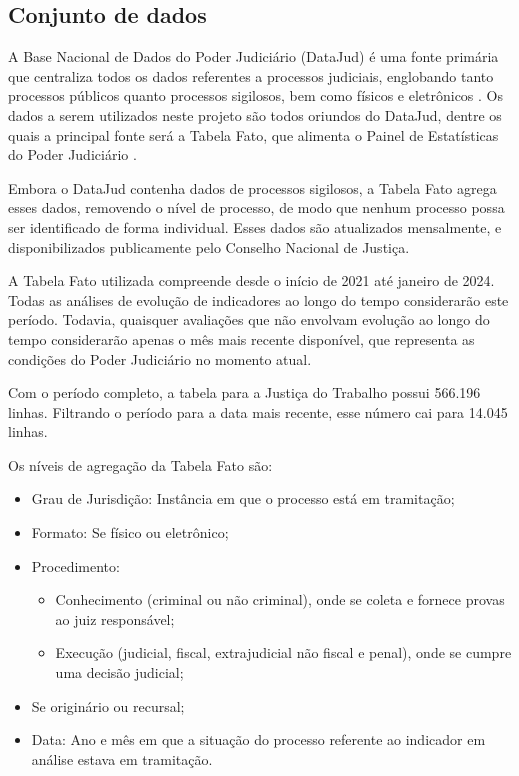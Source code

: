 
\subsection{Conjunto de dados}

A Base Nacional de Dados do Poder Judiciário (DataJud) é uma fonte primária que centraliza todos os dados referentes a processos judiciais, englobando tanto processos públicos quanto processos sigilosos, bem como físicos e eletrônicos \cite{datajud}. Os dados a serem utilizados neste projeto são todos oriundos do DataJud, dentre os quais a principal fonte será a Tabela Fato, que alimenta o Painel de Estatísticas do Poder Judiciário \cite{painelestatistica}.

Embora o DataJud contenha dados de processos sigilosos, a Tabela Fato agrega esses dados, removendo o nível de processo, de modo que nenhum processo possa ser identificado de forma individual. Esses dados são atualizados mensalmente, e disponibilizados publicamente pelo Conselho Nacional de Justiça.

A Tabela Fato utilizada compreende desde o início de 2021 até janeiro de 2024. Todas as análises de evolução de indicadores ao longo do tempo considerarão este período. Todavia, quaisquer avaliações que não envolvam evolução ao longo do tempo considerarão apenas o mês mais recente disponível, que representa as condições do Poder Judiciário no momento atual.

Com o período completo, a tabela para a Justiça do Trabalho possui 566.196 linhas. Filtrando o período para a data mais recente, esse número cai para 14.045 linhas.

Os níveis de agregação da Tabela Fato são:
    
\begin{itemize}
    \item Grau de Jurisdição: Instância em que o processo está em tramitação;
    \item Formato: Se físico ou eletrônico;
    \item Procedimento:
    \begin{itemize}
        \item Conhecimento (criminal ou não criminal), onde se coleta e fornece provas ao juiz responsável;
        \item Execução (judicial, fiscal, extrajudicial não fiscal e penal), onde se cumpre uma decisão judicial;
    \end{itemize}
    \item Se originário ou recursal;
    \item Data: Ano e mês em que a situação do processo referente ao indicador em análise estava em tramitação.
\end{itemize}

